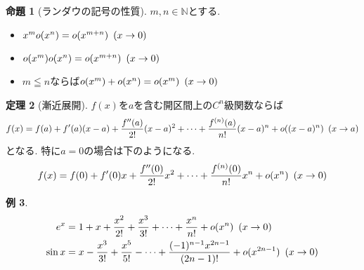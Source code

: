 \documentclass[dvipdfmx,a4paper,11pt]{article}
\newcommand{\N}{\mathbb{N}}
\theoremstyle{definition}
\newtheorem{thm}{定理}
\newtheorem{prop}[thm]{命題}
\newtheorem{exa}[thm]{例}
\begin{document}
\begin{tcolorbox}[
    colback = white,
    colframe = green!35!black,
    fonttitle = \bfseries,
    breakable = true]
    \begin{prop}[ランダウの記号の性質]
$m,n \in \N$とする.
 \begin{itemize}
 \item $x^m o(x^n) = o(x^{m+n}) \text{\,\,\,} (x \rightarrow 0) $
 \item $o(x^m) o(x^n) = o(x^{m+n}) \text{\,\,\,} (x \rightarrow 0) $
 \item $m \leqq n$ならば$o(x^m) + o(x^n) = o(x^{m}) \text{\,\,\,} (x \rightarrow 0) $
 \end{itemize}
    \end{prop}
 \end{tcolorbox}
 
\begin{tcolorbox}[
    colback = white,
    colframe = green!35!black,
    fonttitle = \bfseries,
    breakable = true]
    \begin{thm}[漸近展開]
$f(x)$を$a$を含む開区間上の$C^n$級関数ならば
\begin{align*}
\begin{split}
f(x) &= f(a) + f'(a) (x-a) + \frac{f''(a)}{2!}(x-a)^2 + \cdots +  \frac{f^{(n)}(a)}{n!}(x-a)^{n} + o((x-a)^n) \text{\,\,\,}(x \rightarrow a) \\
\end{split}
\end{align*}
となる.
特に$a=0$の場合は下のようになる.
\begin{align*}
\begin{split}
f(x) &= f(0) + f'(0) x + \frac{f''(0)}{2!}x^2 + \cdots +  \frac{f^{(n)}(0)}{n!}x^{n} + o(x^n) \text{\,\,\,}(x \rightarrow 0) \\
\end{split}
\end{align*}
    \end{thm}
 \end{tcolorbox}
 
 \begin{exa}
\begin{align*}
\begin{split}
e^x &= 1 + x+  \frac{x^2}{2!} + \frac{x^3}{3!}  + \cdots  +  \frac{ x^{n}}{n!} + o(x^{n}) \text{\,\,\,}(x \rightarrow 0) \\
\sin x &= x - \frac{x^3}{3!} + \frac{x^5}{5!} - \cdots  + 
 \frac{(-1)^{n-1} x^{2n-1}}{(2n-1)!} 
 + o(x^{2n-1}) \text{\,\,\,}(x \rightarrow 0) 
\end{split}
\end{align*}
 \end{exa}
\end{document}
